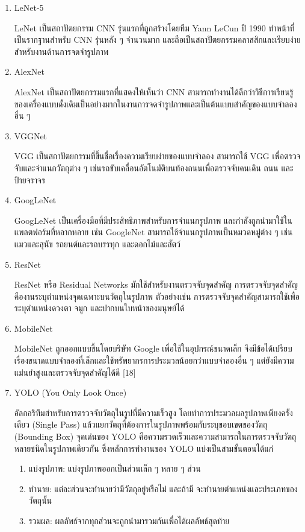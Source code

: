 \documentclass[12pt,oneside,openright,a4paper]{cpe-thai-project}
\begin{document}
\begin{enumerate}
\item LeNet-5

\hspace{2em}LeNet เป็นสถาปัตยกรรม CNN รุ่นแรกที่ถูกสร้างโดยทีม Yann LeCun 
ปี 1990 ทำหน้าที่เป็นรากฐานสำหรับ CNN รุ่นหลัง ๆ จำนวนมาก และถือเป็นสถาปัตยกรรมคลาสสิกและเรียบง่ายสำหรับงานด้านการจดจำรูปภาพ
\item AlexNet

\hspace{2em}AlexNet เป็นสถาปัตยกรรมแรกที่แสดงให้เห็นว่า CNN สามารถทำงานได้ดีกว่าวิธีการเรียนรู้ของเครื่องแบบดั้งเดิมเป็นอย่างมากในงานการจดจำรูปภาพและเป็นต้นแบบสำคัญของแบบจำลองอื่น ๆ
\item VGGNet

\hspace{2em}VGG เป็นสถาปัตยกรรมที่ขึ้นชื่อเรื่องความเรียบง่ายของแบบจำลอง สามารถใช้ VGG เพื่อตรวจจับและจำแนกวัตถุต่าง ๆ เช่นรถขับเคลื่อนอัตโนมัติบนท้องถนนเพื่อตรวจจับคนเดิน ถนน และป้ายจราจร
\item GoogLeNet

\hspace{2em}GoogLeNet เป็นเครื่องมือที่มีประสิทธิภาพสำหรับการจำแนกรูปภาพ และกำลังถูกนำมาใช้ในแพลตฟอร์มที่หลากหลาย เช่น GoogleNet สามารถใช้จำแนกรูปภาพเป็นหมวดหมู่ต่าง ๆ เช่น แมวและสุนัข รถยนต์และรถบรรทุก และดอกไม้และสัตว์
\item ResNet

\hspace{2em}ResNet หรือ Residual Networks มักใช้สำหรับงานตรวจจับจุดสำคัญ การตรวจจับจุดสำคัญคืองานระบุตำแหน่งจุดเฉพาะบนวัตถุในรูปภาพ ตัวอย่างเช่น การตรวจจับจุดสำคัญสามารถใช้เพื่อระบุตำแหน่งดวงตา จมูก และปากบนใบหน้าของมนุษย์ได้
\item MobileNet

\hspace{2em}MobileNet ถูกออกแบบขึ้นโดยบริษัท Google เพื่อใช้ในอุปกรณ์ขนาดเล็ก จึงมีข้อได้เปรียบเรื่องขนาดแบบจำลองที่เล็กและใช้ทรัพยากรการประมวลน้อยกว่าแบบจำลองอื่น ๆ แต่ยังมีความแม่นยำสูงและตรวจจับจุดสำคัญได้ดี [18]
\item YOLO (You Only Look Once)

\hspace{2em}อัลกอริทึมสำหรับการตรวจจับวัตถุในรูปที่มีความเร็วสูง โดยทำการประมวลผลรูปภาพเพียงครั้งเดียว (Single Pass) แล้วแยกวัตถุที่ต้องการในรูปภาพพร้อมกับระบุขอบเขตของวัตถุ (Bounding Box) จุดเด่นของ YOLO คือความรวดเร็วและความสามารถในการตรวจจับวัตถุหลายชนิดในรูปภาพเดียวกัน ซึ่งหลักการทำงานของ YOLO แบ่งเป็นสามขั้นตอนได้แก่
	\begin{enumerate}[label=\alph*.]
		\item แบ่งรูปภาพ: แบ่งรูปภาพออกเป็นส่วนเล็ก ๆ หลาย ๆ ส่วน
		\item ทำนาย: แต่ละส่วนจะทำนายว่ามีวัตถุอยู่หรือไม่ และถ้ามี จะทำนายตำแหน่งและประเภทของวัตถุนั้น
		 \item รวมผล: ผลลัพธ์จากทุกส่วนจะถูกนำมารวมกันเพื่อได้ผลลัพธ์สุดท้าย
	\end{enumerate}



\end{enumerate}
\end{document}
